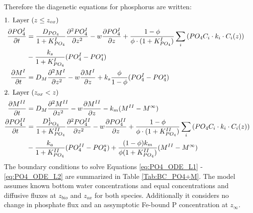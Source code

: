 \documentclass[gmd, manuscript]{copernicus}
\begin{document}
Therefore the diagenetic equations for phosphorus are written:
\begin{align}
\intertext{1. Layer ($z \leq z_{ox}$)}
 \frac{\partial PO_4^I}{\partial t} &= \frac{D_{PO_4}}{1+K_{PO_4}^I} \frac{\partial^2PO_4^I }{\partial z^2} - w\frac{\partial PO_4^I }{\partial z} + \frac{1-\phi}{\phi \cdot (1+K_{PO_4}^I)}\sum_i 
					\left( PO_4C_i \cdot k_i \cdot C_{i}(z) \right) \notag\\
					& - \frac{k_{s}}{1+K_{PO_4}^I}(PO_4^I-PO_4^s)\label{eq:PO4_ODE_L1}\\  %
 \frac{\partial M^I}{\partial t} &= D_{M}\frac{\partial^2M^I }{\partial z^2} - w\frac{\partial M^I }{\partial z} + k_{s}\frac{\phi}{1-\phi}(PO_4^I-PO_4^s)\label{eq:M_ODE_L1}\\  
 \intertext{2. Layer ($z_{ox} < z$)} 
 \frac{\partial M^{II}}{\partial t} & = D_{M}\frac{\partial^2M^{II} }{\partial z^2} - w\frac{\partial M^{II} }{\partial z} - k_{m}(M^{II} - M^\infty)\label{eq:M_ODE_L2}\\  
 \frac{\partial PO_4^{II}}{\partial t} &= \frac{D_{PO_4}^1}{1+K_{PO_4}^{II}} \frac{\partial^2PO_4^{II} }{\partial z^2} - w\frac{\partial PO_4^{II} }{\partial z} + \frac{1-\phi}{\phi \cdot (1+K_{PO_4}^{II})}\sum_i 
					\left( PO_4C_i \cdot k_i \cdot C_{i}(z) \right) \notag\\
					& - \frac{k_{a}}{1+K_{PO_4}^{II}}(PO_4^{II}-PO_4^a) + \frac{(1-\phi)k_{m}}{\phi(1+K_{PO_4}^{II})}(M^{II}-M^\infty)\label{eq:PO4_ODE_L2}\\
\end{align}
The boundary conditions to solve Equations \ref{eq:PO4_ODE_L1} - \ref{eq:PO4_ODE_L2} are summarized in Table \ref{Tab:BC_PO4+M}. 
The model assumes known bottom water concentrations and equal concentrations and diffusive fluxes at $z_{bio}$ and $z_{ox}$ for both species. Additionally it considers no change in phosphate flux and an assymptotic Fe-bound P 
concentration at $z_\infty$. 
\end{document}
